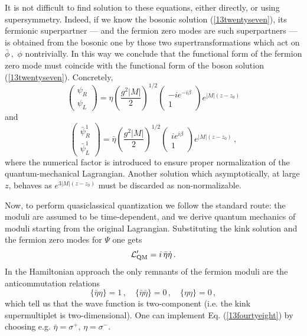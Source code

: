 \documentclass[epsfig,12pt]{article}
\def\beq{\begin{equation}}
\def\eeq{\end{equation}}
\def\beq{\begin{equation}}
\def\eeq{\end{equation}}
\begin{document}
It is not difficult to find solution to these 
equations, either directly, or using supersymmetry.
Indeed, if we know the bosonic solution (\ref{13twentyseven}),
its fermionic superpartner --- and the fermion zero modes are such 
 superpartners --- is obtained from the
bosonic one by those two supertransformations which act on
$\bar\phi\,,\,\,\phi$ nontrivially.
In this way we conclude that the
  functional form of the fermion zero mode 
must coincide  with the functional form of the boson  
  solution (\ref{13twentyseven}). Concretely,
\beq
\left(\begin{array}{c}
\psi_R\\  \psi_L
\end{array}
\right)=\eta 
\left(\frac{g^2|M|}{2}\right)^{1/2}
\left(\begin{array}{c}
-ie^{-i\beta}\\   1
\end{array}
\right)e^{|M|(z-z_0)}
\label{13fourtyfive}
\eeq
 and
 \beq
\left(\begin{array}{c}
\bar \psi_R^1\\  \bar \psi_L^1
\end{array}
\right)=\bar\eta \left(\frac{g^2|M|}{2}\right)^{1/2} \left(\begin{array}{c}
ie^{ i\beta}\\   1
\end{array}
\right)e^{|M|(z-z_0)}\,,
\label{13fourtysix}
\eeq
where the numerical factor is introduced to ensure proper
normalization of the quantum-mechanical Lagrangian.
Another solution which asymptotically, at large $z$, behaves
as $e^{3|M|(z-z_0)}$ must be discarded as non-normalizable.

Now, to
perform   quasiclassical quantization we follow the standard route:
the moduli are assumed to be   time-dependent, and we derive 
quantum mechanics of moduli starting from the original Lagrangian.
Substituting the kink solution   and the fermion zero modes for
$\Psi$ one gets
\beq
{\cal L}'_{\rm QM} = i\, \bar\eta\dot\eta\,.
\label{13fourtyseven}
\eeq
In the Hamiltonian approach the only remnants of the fermion moduli
are the anticommutation relations
\beq
\{\bar\eta\eta\} =1\,,\quad \{\bar\eta \bar\eta\} =0\,,\quad \{\eta \eta\} =0\,,
\label{13fourtyeight}
\eeq
which tell us that the wave function is two-component
(i.e. the kink supermultiplet is two-dimensional). One can implement
Eq. (\ref{13fourtyeight}) by choosing e.g. 
$\bar\eta=\sigma^+$, $ \eta=\sigma^-$.


\end{document}
